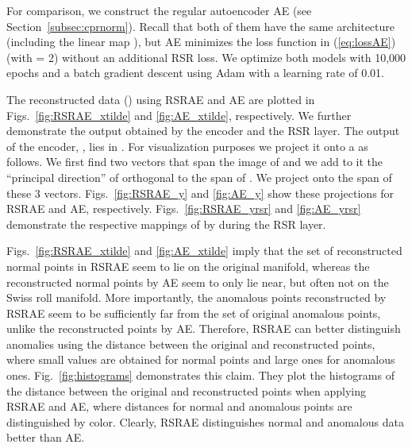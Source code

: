 \documentclass{article} \usepackage{iclr2020_conference,times}
\def\Secref#1{Section~\ref{#1}}
\def\eqref#1{(\ref{#1})}
\begin{document}
For comparison, we construct the regular autoencoder AE (see \Secref{subsec:cprnorm}). Recall that both of them have the same architecture (including the linear map ), but AE minimizes the  loss function in \eqref{eq:lossAE} (with  = 2) without an additional RSR loss. We optimize both models with 10,000 epochs and a batch gradient descent using Adam \citep{kingma2014adam} with a learning rate of 0.01. 

The reconstructed data () using  
RSRAE and AE are plotted in Figs.~\ref{fig:RSRAE_xtilde} and \ref{fig:AE_xtilde}, respectively. 
We further demonstrate the output obtained by the encoder and the RSR layer. The output of the encoder, , lies in . For visualization purposes we project it onto a  as follows. We first find two vectors that span the image of   and we add to it the ``principal direction'' of  orthogonal to the span of . We project  onto the span of these 3 vectors.  Figs.~\ref{fig:RSRAE_y} and \ref{fig:AE_y} show these projections for RSRAE and AE, respectively. Figs.~\ref{fig:RSRAE_yrsr} and \ref{fig:AE_yrsr} demonstrate the respective mappings of  by  during the RSR layer.  

Figs.~\ref{fig:RSRAE_xtilde} and \ref{fig:AE_xtilde} imply that the set of reconstructed normal points in RSRAE seem to lie on the original manifold, whereas the reconstructed normal points by AE seem to only lie near, but often not on the Swiss roll manifold. More importantly, the anomalous points reconstructed by RSRAE seem to be sufficiently far from the set of original anomalous points, unlike the reconstructed points by AE. Therefore, RSRAE can better distinguish anomalies using the distance between the original and reconstructed points, where small values are obtained for normal points and large ones for anomalous ones. 
Fig.~\ref{fig:histograms} demonstrates this claim. They plot the histograms of the distance 
between the original and reconstructed points when applying RSRAE and AE, where distances for normal and anomalous points are distinguished by color. Clearly, RSRAE distinguishes normal and anomalous data better than AE. 
\end{document}

